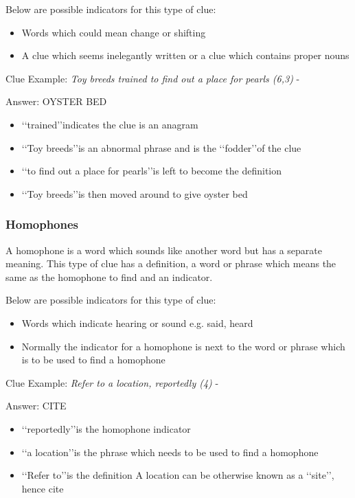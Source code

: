 Below are possible indicators for this type of clue:
\begin{itemize} 
	\item Words which could mean change or shifting 
	\item A clue which seems inelegantly written or a clue which contains proper nouns
\\
\end{itemize}

Clue Example: \emph{Toy breeds trained to find out a place for pearls (6,3)} - \citep{shuchiAnagram08} 

Answer: OYSTER BED 

\begin{itemize}
	\item \lq\lq trained\rq\rq indicates the clue is an anagram   
	\item \lq\lq Toy breeds\rq\rq is an abnormal phrase and is the \lq\lq fodder\rq\rq of the clue 
	\item \lq\lq to find out a place for pearls\rq\rq is left to become the definition 
	\item \lq\lq Toy breeds\rq\rq is then moved around to give oyster bed 
\end{itemize}

\subsubsection{Homophones}

A homophone is a word which sounds like another word but has a separate meaning. This type of clue has a definition, a word or phrase which means the same as the homophone to find and an indicator. 

Below are possible indicators for this type of clue:
\begin{itemize} 
	\item Words which indicate hearing or sound e.g. said, heard 
	\item Normally the indicator for a homophone is next to the word or phrase which is to be used to find a homophone  
\\
\end{itemize}

Clue Example: \emph{Refer to a location, reportedly (4)} - \citep{shuchiHomophone08}

Answer: CITE 

\begin{itemize}
	\item \lq\lq reportedly\rq\rq is the homophone indicator 
	\item \lq\lq a location\rq\rq is the phrase which needs to be used to find a homophone 
	\item\lq\lq Refer to\rq\rq is the definition 
	A location can be otherwise known as a \lq\lq site\rq\rq, hence cite 
\end{itemize}

